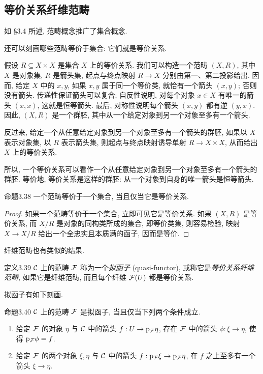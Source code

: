 \subsection{等价关系纤维范畴}
如 \S3.4 所述, 范畴概念推广了集合概念.

还可以刻画哪些范畴等价于集合: 它们就是等价关系.

假设 $R\subseteq X\times X$ 是集合 $X$ 上的等价关系. 我们可以构造一个范畴 $(X,R)$, 其中 $X$ 是对象集, $R$ 是箭头集, 起点与终点映射 $R\to X$ 分别由第一、第二投影给出. 因而, 给定 $X$ 中的 $x,y$, 如果 $x,y$ 属于同一个等价类, 就恰有一个箭头 $(x,y)$; 否则没有箭头. 传递性保证箭头可以复合; 自反性说明, 对每个对象 $x\in X$ 有唯一的箭头 $(x,x)$, 这就是恒等箭头. 最后, 对称性说明每个箭头 $(x,y)$ 都有逆 $(y,x)$. 因此, $(X,R)$ 是一个群胚, 其中从一个给定对象到另一个对象至多有一个箭头.

反过来, 给定一个从任意给定对象到另一个对象至多有一个箭头的群胚, 如果以 $X$ 表示对象集, 以 $R$ 表示箭头集, 则起点与终点映射诱导单射 $R\to X\times X$, 从而给出 $X$ 上的等价关系.

所以, 一个等价关系可以看作一个从任意给定对象到另一个对象至多有一个箭头的群胚. 等价地, 等价关系是这样的群胚: 从一个对象到自身的唯一箭头是恒等箭头.

\begin{origstatement}{命题}{3.38}\label{ch03:prop338}
一个范畴等价于一个集合, 当且仅当它是等价关系.
\end{origstatement}
\begin{proof}
如果一个范畴等价于一个集合, 立即可见它是等价关系. 如果 $(X,R)$ 是等价关系, 而 $X/R$ 是对象的同构类所成的集合, 即等价类集, 则容易检验, 映射 $X\to X/R$ 给出一个全忠实且本质满的函子, 因而是等价.
\end{proof}

纤维范畴也有类似的结果.

\begin{origstatement}{定义}{3.39}\label{ch03:def339}
$\mathcal C$ 上的范畴 $\mathcal F$ 称为一个\emph{拟函子} (quasi-functor), 或称它是\emph{等价关系纤维范畴}, 如果它是纤维范畴, 而且每个纤维 $\mathcal F(U)$ 都是等价关系.
\end{origstatement}

拟函子有如下刻画.

\begin{origstatement}{命题}{3.40}\label{ch03:prop340}
$\mathcal C$ 上的范畴 $\mathcal F$ 是拟函子, 当且仅当下列两个条件成立.
\begin{enumerate}
\item[(i)] 给定 $\mathcal F$ 的对象 $\eta$ 与 $\mathcal C$ 中的箭头 $f:U\to\mathrm p_{\mathcal F}\eta$, 存在 $\mathcal F$ 中的箭头 $\phi:\xi\to\eta$, 使得 $\mathrm p_{\mathcal F}\phi=f$.
\item[(ii)] 给定 $\mathcal F$ 的两个对象 $\xi,\eta$ 与 $\mathcal C$ 中的箭头 $f:\mathrm p_{\mathcal F}\xi\to\mathrm p_{\mathcal F}\eta$, 在 $f$ 之上至多有一个箭头 $\xi\to\eta$.
\end{enumerate}
\end{origstatement}

